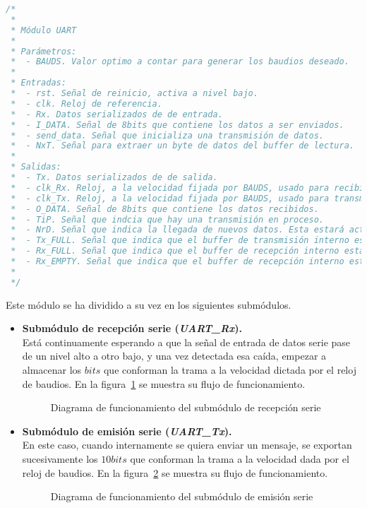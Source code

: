 \begin{lstlisting}[language=Verilog,
    caption={Parámetros, entradas y salidas del módulo UART.},
    label=src:resultados-modulos-uart]
/*
 *
 * Módulo UART
 *
 * Parámetros:
 *  - BAUDS. Valor optimo a contar para generar los baudios deseado.
 *
 * Entradas:
 *  - rst. Señal de reinicio, activa a nivel bajo.
 *  - clk. Reloj de referencia.
 *  - Rx. Datos serializados de de entrada.
 *  - I_DATA. Señal de 8bits que contiene los datos a ser enviados.
 *  - send_data. Señal que inicializa una transmisión de datos.
 *  - NxT. Señal para extraer un byte de datos del buffer de lectura.
 *
 * Salidas:
 *  - Tx. Datos serializados de de salida.
 *  - clk_Rx. Reloj, a la velocidad fijada por BAUDS, usado para recibir los datos.
 *  - clk_Tx. Reloj, a la velocidad fijada por BAUDS, usado para transmitir los datos.
 *  - O_DATA. Señal de 8bits que contiene los datos recibidos.
 *  - TiP. Señal que indcia que hay una transmisión en proceso.
 *  - NrD. Señal que indica la llegada de nuevos datos. Esta estará activa un pulso de clk.
 *  - Tx_FULL. Señal que indica que el buffer de transmisión interno está lleno.
 *  - Rx_FULL. Señal que indica que el buffer de recepción interno está lleno.
 *  - Rx_EMPTY. Señal que indica que el buffer de recepción interno está vacío.
 *
 */
\end{lstlisting}

Este módulo se ha dividido a su vez en los siguientes submódulos.
\begin{itemize}
    \item \textbf{Submódulo de recepción serie (\emph{UART\_Rx}).} \\
    Está continuamente esperando a que la señal de entrada de datos serie pase de un nivel alto a otro bajo, y una vez detectada esa caída, empezar a almacenar los $bits$ que conforman la trama a la velocidad dictada por el reloj de baudios. En la figura~\ref{fig:flujo_uart_rx} se muestra su flujo de funcionamiento.

    \begin{figure}[!hbt]
        \centering
        \scalebox{0.85} {}
        \caption{Diagrama de funcionamiento del submódulo de recepción serie}
        \label{fig:flujo_uart_rx}
    \end{figure}
    
    \item \textbf{Submódulo de emisión serie (\emph{UART\_Tx}).} \\
    En este caso, cuando internamente se quiera enviar un mensaje, se exportan sucesivamente los $10bits$ que conforman la trama a la velocidad dada por el reloj de baudios. En la figura~\ref{fig:flujo_uart_tx} se muestra su flujo de funcionamiento.
    \begin{figure}[!hbt]
        \centering
        \scalebox{0.85} {}
        \caption{Diagrama de funcionamiento del submódulo de emisión serie}
        \label{fig:flujo_uart_tx}
    \end{figure}
\end{itemize}



